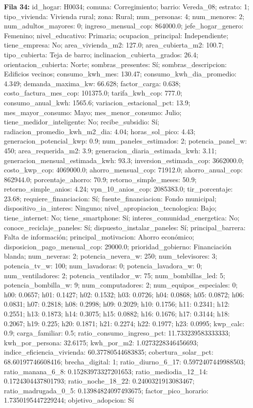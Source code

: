 {\footnotesize\textbf{Fila 34:} id\_hogar: H0034; comuna: Corregimiento; barrio: Vereda\_08; estrato: 1; tipo\_vivienda: Vivienda rural; zona: Rural; num\_personas: 4; num\_menores: 2; num\_adultos\_mayores: 0; ingreso\_mensual\_cop: 864000.0; jefe\_hogar\_genero: Femenino; nivel\_educativo: Primaria; ocupacion\_principal: Independiente; tiene\_empresa: No; area\_vivienda\_m2: 127.0; area\_cubierta\_m2: 100.7; tipo\_cubierta: Teja de barro; inclinacion\_cubierta\_grados: 26.4; orientacion\_cubierta: Norte; sombras\_presentes: Sí; sombras\_descripcion: Edificios vecinos; consumo\_kwh\_mes: 130.47; consumo\_kwh\_dia\_promedio: 4.349; demanda\_maxima\_kw: 66.628; factor\_carga: 0.638; costo\_factura\_mes\_cop: 101375.0; tarifa\_kwh\_cop: 777.0; consumo\_anual\_kwh: 1565.6; variacion\_estacional\_pct: 13.9; mes\_mayor\_consumo: Mayo; mes\_menor\_consumo: Julio; tiene\_medidor\_inteligente: No; recibe\_subsidio: Sí; radiacion\_promedio\_kwh\_m2\_dia: 4.04; horas\_sol\_pico: 4.43; generacion\_potencial\_kwp: 0.9; num\_paneles\_estimados: 2; potencia\_panel\_w: 450; area\_requerida\_m2: 3.9; generacion\_diaria\_estimada\_kwh: 3.11; generacion\_mensual\_estimada\_kwh: 93.3; inversion\_estimada\_cop: 3662000.0; costo\_kwp\_cop: 4069000.0; ahorro\_mensual\_cop: 71912.0; ahorro\_anual\_cop: 862944.0; porcentaje\_ahorro: 70.9; retorno\_simple\_meses: 50.9; retorno\_simple\_anios: 4.24; vpn\_10\_anios\_cop: 2085383.0; tir\_porcentaje: 23.68; requiere\_financiacion: Sí; fuente\_financiacion: Fondo municipal; dispositivo\_ia\_interes: Ninguno; nivel\_apropiacion\_tecnologica: Bajo; tiene\_internet: No; tiene\_smartphone: Sí; interes\_comunidad\_energetica: No; conoce\_reciclaje\_paneles: Sí; dispuesto\_instalar\_paneles: Sí; principal\_barrera: Falta de información; principal\_motivacion: Ahorro económico; disposicion\_pago\_mensual\_cop: 29000.0; prioridad\_gobierno: Financiación blanda; num\_neveras: 2; potencia\_nevera\_w: 250; num\_televisores: 3; potencia\_tv\_w: 100; num\_lavadoras: 0; potencia\_lavadora\_w: 0; num\_ventiladores: 2; potencia\_ventilador\_w: 75; num\_bombillas\_led: 5; potencia\_bombilla\_w: 9; num\_computadores: 2; num\_equipos\_especiales: 0; h00: 0.0657; h01: 0.1427; h02: 0.1532; h03: 0.0726; h04: 0.0868; h05: 0.0872; h06: 0.0831; h07: 0.2818; h08: 0.2998; h09: 0.2029; h10: 0.1756; h11: 0.2341; h12: 0.2551; h13: 0.1873; h14: 0.3075; h15: 0.0882; h16: 0.1676; h17: 0.3144; h18: 0.2067; h19: 0.225; h20: 0.1871; h21: 0.2274; h22: 0.1977; h23: 0.0995; kwp\_calc: 0.9; carga\_familiar: 0.5; ratio\_consumo\_ingreso\_pct: 11.733239583333333; kwh\_por\_persona: 32.6175; kwh\_por\_m2: 1.0273228346456693; indice\_eficiencia\_vivienda: 60.37780544683835; cobertura\_solar\_pct: 68.60197746608416; brecha\_digital: 1; ratio\_diurno\_6\_17: 0.5972407449988503; ratio\_manana\_6\_8: 0.15283973327201653; ratio\_mediodia\_12\_14: 0.1724304437801793; ratio\_noche\_18\_22: 0.2400321913083467; ratio\_madrugada\_0\_5: 0.13984824097493675; factor\_pico\_horario: 1.7350195447229244; objetivo\_adopcion: Sí\par}
